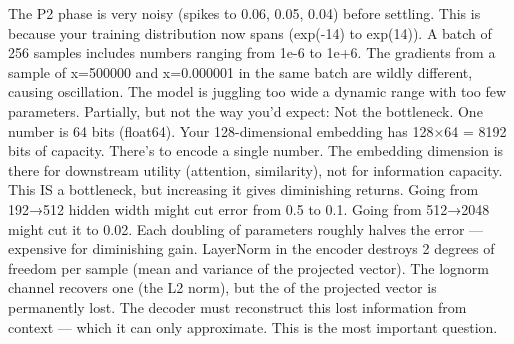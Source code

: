 {}
\markdownRendererSectionEnd \markdownRendererSectionBegin
{}\markdownRendererInterblockSeparator
{}The P2 phase is very noisy (spikes to 0.06, 0.05, 0.04) before settling. This is because your training distribution now spans  (exp(-14) to exp(14)). A batch of 256 samples includes numbers ranging from 1e-6 to 1e+6. The gradients from a sample of x=500000 and x=0.000001 in the same batch are wildly different, causing oscillation. The model is juggling too wide a dynamic range with too few parameters.\markdownRendererInterblockSeparator
{}\markdownRendererThematicBreak{}\markdownRendererInterblockSeparator
{}
\markdownRendererSectionEnd 
\markdownRendererSectionEnd \markdownRendererSectionBegin
{}\markdownRendererInterblockSeparator
{}Partially, but not the way you'd expect:\markdownRendererParagraphSeparator
{} Not the bottleneck. One number is 64 bits (float64). Your 128-dimensional embedding has 128×64 = 8192 bits of capacity. There's  to encode a single number. The embedding dimension is there for downstream utility (attention, similarity), not for information capacity.\markdownRendererParagraphSeparator
{} This IS a bottleneck, but increasing it gives diminishing returns. Going from 192→512 hidden width might cut error from 0.5\markdownRendererPercentSign{} to 0.1\markdownRendererPercentSign{}. Going from 512→2048 might cut it to 0.02\markdownRendererPercentSign{}. Each doubling of parameters roughly halves the error — expensive for diminishing gain.\markdownRendererParagraphSeparator
{} LayerNorm in the encoder destroys 2 degrees of freedom per sample (mean and variance of the projected vector). The log\markdownRendererUnderscore{}norm channel recovers one (the L2 norm), but the  of the projected vector is permanently lost. The decoder must reconstruct this lost information from context — which it can only approximate.\markdownRendererInterblockSeparator
{}\markdownRendererThematicBreak{}\markdownRendererInterblockSeparator
{}
\markdownRendererSectionEnd \markdownRendererSectionBegin
{}\markdownRendererInterblockSeparator
{}This is the most important question. \markdownRendererInterblockSeparator
